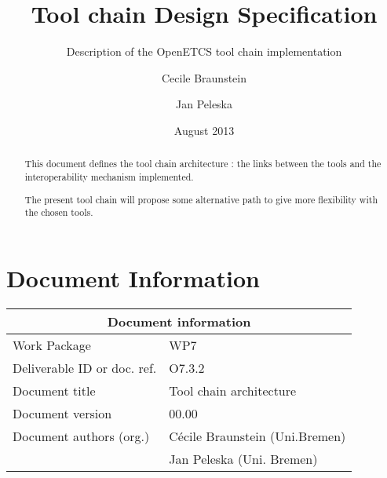\documentclass{openetcs_report}
\begin{document}
\frontmatter
{}




\title{Tool chain Design Specification}

\subtitle{Description of the OpenETCS tool chain implementation}

\date{August 2013}


\author{Cecile Braunstein \and Jan Peleska}







\begin{abstract}
This document defines the tool chain architecture : the links between
the tools and the interoperability mechanism implemented.

The present tool chain will propose some alternative path to give more
flexibility with the chosen tools.
\end{abstract}

\maketitle
\tableofcontents
\listoffiguresandtables

\newpage

\chapter{Document Information}
\begin{tabular}{|p{4.4cm}|p{8.7cm}|}
\hline
\multicolumn{2}{|c|}{Document information} \\
\hline
Work Package &  WP7  \\
Deliverable ID or doc. ref. & O7.3.2\\
\hline
Document title & Tool chain architecture \\
Document version & 00.00 \\
Document authors (org.)  & Cécile Braunstein  (Uni.Bremen)  \\
& Jan Peleska (Uni. Bremen)\\
\hline
\end{tabular}
\end{document}
